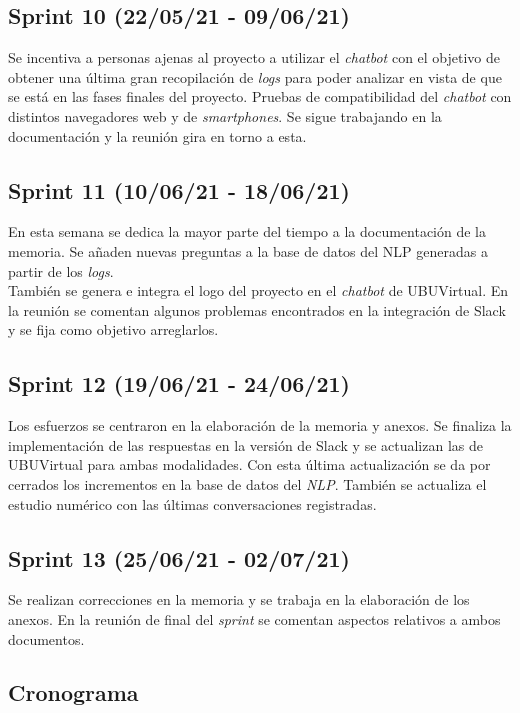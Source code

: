 \subsection{Sprint 10 (22/05/21 - 09/06/21)}

Se incentiva a personas ajenas al proyecto a utilizar el \textit{chatbot} con el objetivo de obtener una última gran recopilación de \textit{logs} para poder analizar en vista de que se está en las fases finales del proyecto.
Pruebas de compatibilidad del \textit{chatbot} con distintos navegadores web y de \textit{smartphones}.
Se sigue trabajando en la documentación y la reunión gira en torno a esta.

\subsection{Sprint 11 (10/06/21 - 18/06/21)}

En esta semana se dedica la mayor parte del tiempo a la documentación de la memoria. Se añaden nuevas preguntas a la base de datos del NLP generadas a partir de los \textit{logs}.\\
También se genera e integra el logo del proyecto en el \textit{chatbot} de UBUVirtual.
En la reunión se comentan algunos problemas encontrados en la integración de Slack y se fija como objetivo arreglarlos.

\subsection{Sprint 12 (19/06/21 - 24/06/21)}

Los esfuerzos se centraron en la elaboración de la memoria y anexos. Se finaliza la implementación de las respuestas en la versión de Slack y se actualizan las de UBUVirtual para ambas modalidades. Con esta última actualización se da por cerrados los incrementos en la base de datos del \textit{NLP}. También se actualiza el estudio numérico con las últimas conversaciones registradas.

\subsection{Sprint 13 (25/06/21 - 02/07/21)}

Se realizan correcciones en la memoria y se trabaja en la elaboración de los anexos.
En la reunión de final del \textit{sprint} se comentan aspectos relativos a ambos documentos. 


\subsection{Cronograma}

